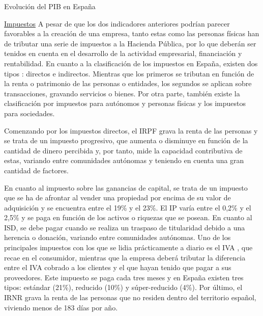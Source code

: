 \begin{table}[!htbp]
	\centering
	{\small
		
	}
	\caption[Evolución del \acs{PIB} en España]
	{Evolución del \acs{PIB} en España}
	\label{tab:evo_pib}
\end{table}

\noindent\underline{Impuestos}\newline
\indent A pesar de que los dos indicadores anteriores podrían parecer favorables a la creación de una empresa, tanto estas como las personas físicas han de tributar una serie de impuestos a la Hacienda Pública, por lo que deberán ser tenidos en cuenta en el desarrollo de la actividad empresarial, financiación y rentabilidad. En cuanto a la clasificación de los impuestos en España, existen dos tipos \cite{balcellsg}: directos e indirectos. Mientras que los primeros se tributan en función de la renta o patrimonio de las personas o entidades, los segundos se aplican sobre transacciones, gravando servicios o bienes. Por otra parte, también existe la clasificación por impuestos para autónomos y personas físicas y los impuestos para sociedades.

Comenzando por los impuestos directos, el \acf{IRPF} grava la renta de las personas y se trata de un impuesto progresivo, que aumenta o disminuye en función de la cantidad de dinero percibida y, por tanto, mide la capacidad contributiva de estas, variando entre comunidades autónomas y teniendo en cuenta una gran cantidad de factores.

En cuanto al impuesto sobre las ganancias de capital, se trata de un impuesto que se ha de afrontar al vender una propiedad por encima de su valor de adquisición y se encuentra entre el 19\% y el 23\%. El \acf{IP} varía entre el 0,2\% y el 2,5\% y se paga en función de los activos o riquezas que se posean. En cuanto al \acf{ISD}, se debe pagar cuando se realiza un traspaso de titularidad debido a una herencia o donación, variando entre comunidades autónomas. Uno de los principales impuestos con los que se lidia prácticamente a diario es el \acf{IVA} \cite{impuestosautonomo}, que recae en el consumidor, mientras que la empresa deberá tributar la diferencia entre el \acs{IVA} cobrado a los clientes y el que hayan tenido que pagar a sus proveedores. Este impuesto se paga cada tres meses y en España existen tres tipos: estándar (21\%), reducido (10\%) y súper-reducido (4\%). Por último, el \acf{IRNR} grava la renta de las personas que no residen dentro del territorio español, viviendo menos de 183 días por año. 

